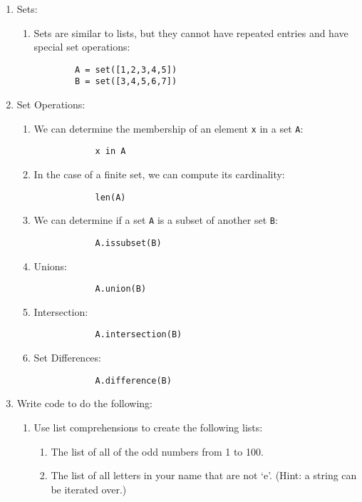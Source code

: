 \documentclass{ximera}
\begin{document}
\begin{enumerate}
\item Sets:
    \begin{enumerate}
    \item Sets are similar to lists, but they cannot have repeated entries and have special set operations:
        \begin{verbatim}
        A = set([1,2,3,4,5])
        B = set([3,4,5,6,7])
        \end{verbatim}
    \end{enumerate}
\item Set Operations:
    \begin{enumerate}
        \item We can determine the membership of an element \verb|x| in a set \verb|A|:
        \begin{verbatim}
            x in A
        \end{verbatim}
        \item In the case of a finite set, we can compute its cardinality:
        \begin{verbatim}
            len(A)
        \end{verbatim}
        \item We can determine if a set \verb|A| is a subset of another set \verb|B|:
        \begin{verbatim}
            A.issubset(B)
        \end{verbatim}
        \item Unions:
        \begin{verbatim}
            A.union(B)
        \end{verbatim}
        \item Intersection:
        \begin{verbatim}
            A.intersection(B)
        \end{verbatim}
        \item Set Differences:
        \begin{verbatim}
            A.difference(B)
        \end{verbatim}
    \end{enumerate}
\item Write code to do the following:
    \begin{enumerate}
    \item Use list comprehensions to create the following lists:
    \begin{enumerate}
        \item The list of all of the odd numbers from 1 to 100.
        \item The list of all letters in your name that are not `e'. (Hint: a string can be iterated over.)

\end{enumerate}
\end{enumerate}
\end{enumerate}
\end{document}
